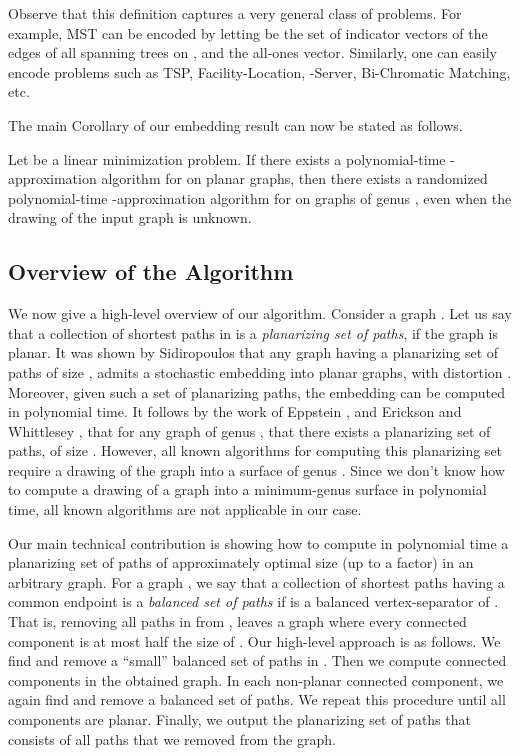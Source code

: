\documentclass[envcountsect]{llncs}
\begin{document}
Observe that this definition captures a very general class of problems.
For example, MST can be encoded by letting  be the set of indicator vectors of the edges of all spanning trees on , and  the all-ones vector.
Similarly, one can easily encode problems such as TSP, Facility-Location, -Server, Bi-Chromatic Matching, etc.

The main Corollary of our embedding result can now be stated as follows.

\begin{corollary}\label{cor:opt}
Let  be a linear minimization problem.  If there exists a polynomial-time -approximation algorithm for  on planar graphs, then there exists a randomized polynomial-time -approximation algorithm for  on graphs of genus , even when the drawing of the input graph is unknown.
\end{corollary}


\subsection{Overview of the Algorithm}
We now give a high-level overview of our algorithm.
Consider a graph .
Let us say that a collection  of shortest paths in  is a \emph{planarizing set of paths}, if the graph  is planar.
It was shown by Sidiropoulos \cite{sidiropoulos2010optimal} that any graph having a planarizing set of paths of size , admits a stochastic embedding into planar graphs, with distortion .
Moreover, given such a set of planarizing paths, the embedding can be computed in polynomial time.
It follows by the work of Eppstein \cite{eppstein2003dynamic}, and Erickson and Whittlesey \cite{erickson2005greedy}, that for any graph  of genus , that there exists a planarizing set of paths, of size .
However, all known algorithms for computing this planarizing set require a drawing of the graph into a surface of genus .
Since we don't know how to compute a drawing of a graph into a minimum-genus surface in polynomial time, all known algorithms are not applicable in our case.

Our main technical contribution is showing how to compute in polynomial time a planarizing set of paths 
of approximately optimal size (up to a  factor) in an arbitrary graph.
For a graph , we say that a collection  of shortest paths having a common endpoint is a \emph{balanced set of paths} if  is a balanced vertex-separator of . That is, removing all paths in  from , leaves a graph where every connected component is at most half the size of .
Our high-level approach is as follows. We find and remove a ``small'' balanced set of paths in . 
Then we compute connected components in the obtained graph.
In each non-planar connected component, we again find and remove a balanced set of paths. We 
repeat this procedure until all components are planar. Finally, we output the planarizing set of paths 
that consists of all paths that we removed from the graph.
\end{document}
